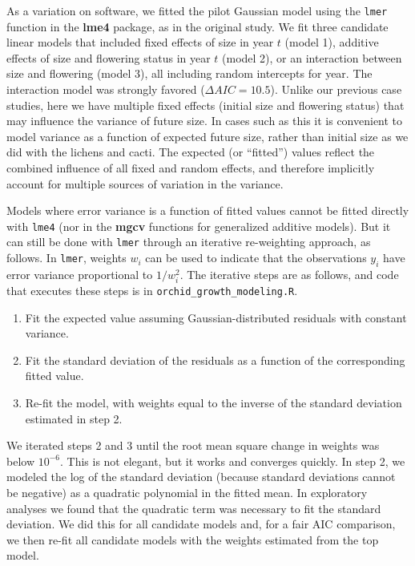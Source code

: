 \documentclass[12pt]{article}
\begin{document}
\begin{spacing}{1.9}
As a variation on software, we fitted the pilot Gaussian model using the \texttt{lmer} function in the \textbf{lme4} package, as in the original study.
We fit three candidate linear models that included fixed effects of size in year $t$ (model 1), additive effects of size and flowering status in year $t$ (model 2), or an interaction between size and flowering (model 3), all including random intercepts for year. 
The interaction model was strongly favored ($\Delta AIC = 10.5$). 
Unlike our previous case studies, here we have multiple fixed effects (initial size and flowering status) that may influence the variance of future size. 
In cases such as this it is convenient to model variance as a function of expected future size, rather than initial size as we did with the lichens and cacti. 
The expected (or ``fitted'') values reflect the combined influence of all fixed and random effects, and therefore implicitly account for multiple sources of variation in the variance. 

Models where error variance is a function of fitted values cannot be fitted directly with \texttt{lme4} (nor 
in the \textbf{mgcv} functions for generalized additive models). 
But it can still be done with \texttt{lmer} through an iterative re-weighting approach, as follows. 
In \texttt{lmer}, weights $w_{i}$ can be used to indicate that the observations $y_{i}$ have error variance proportional to $1/w_i^2$. 
The iterative steps are as follows, and code that executes these steps is in \texttt{orchid\_growth\_modeling.R}. 
\begin{enumerate}
	\item Fit the expected value assuming Gaussian-distributed residuals with constant variance. 
	\item Fit the standard deviation of the residuals as a function of the corresponding fitted value. 
	\item Re-fit the model, with weights equal to the inverse of the standard deviation estimated in step 2. 
\end{enumerate}
We iterated steps 2 and 3 until the root mean square change in weights was below $10^{-6}$. 
This is not elegant, but it works and converges quickly. 
In step 2, we modeled the log of the standard deviation (because standard deviations cannot be negative) as a quadratic polynomial in the fitted mean.  
In exploratory analyses we found that the quadratic term was necessary to fit the standard deviation. 
We did this for all candidate models and, for a fair AIC comparison, we then re-fit all candidate models with the weights estimated from the top model. 


\end{spacing}
\end{document}
